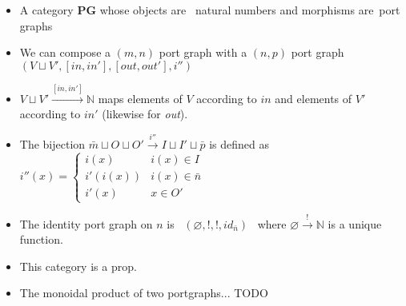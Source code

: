 
\begin{itemize}
    \item A category \textbf{PG} whose objects are \, natural numbers and morphisms are \,port graphs \,
    \item We can compose a $(m,n)$ port graph with a $(n, p)$ port graph $(V \sqcup V',[in,in'],[out,out'], i'')$
    \item $V \sqcup V' \xrightarrow{[in,in']} \mathbb{N}$ maps elements of $V$ according to $in$ and elements of $V'$ according to $in'$ (likewise for \emph{out}).
    \item  The bijection $\bar m \sqcup O \sqcup O' \xrightarrow{i''} I \sqcup I' \sqcup \bar p$ is defined as \, $i''(x)=\begin{cases}i(x) & i(x) \in I \\ i'(i(x))& i(x) \in \bar n \\ i'(x) & x \in O' \end{cases}$ \,
    \item The identity port graph on $n$ is \, $(\varnothing, !, !, id_{\bar n})$ \, where $\varnothing \xrightarrow{!} \mathbb{N}$ is a unique function.
    \item This category is a prop.
    \item The monoidal product of two portgraphs... TODO
  \end{itemize}